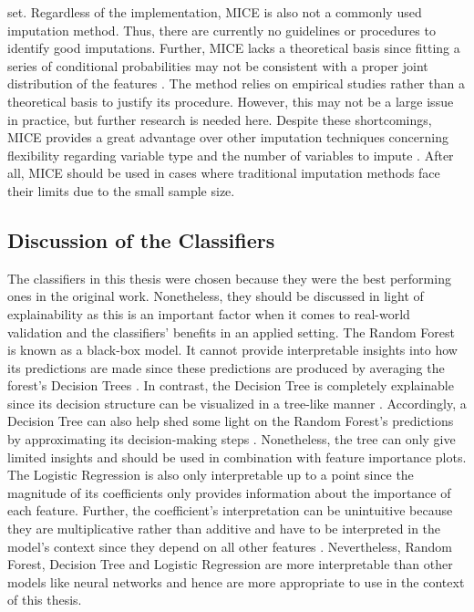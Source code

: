 set.
Regardless of the implementation, MICE is also not a commonly used imputation 
method. Thus, there are currently no guidelines or procedures to identify 
good imputations. Further, MICE lacks a theoretical basis since fitting a 
series of conditional probabilities may not be consistent with a proper joint 
distribution of the features \cite{RN141}. The method relies on empirical 
studies rather than a 
theoretical basis to justify its procedure. However, this may not be a large 
issue in practice, but further research is needed here. Despite these 
shortcomings, MICE 
provides a great advantage over other imputation techniques concerning 
flexibility regarding variable type and the number of variables to impute 
\cite{RN141, RN142}. After all, MICE should be used in cases where traditional 
imputation methods face their limits due to the small sample size.
\subsection{Discussion of the Classifiers}
\label{sec:classifiers}
The classifiers in this thesis were chosen because they were the best performing 
ones in the original work. Nonetheless, they should be discussed in light of 
explainability as this is an important factor when it comes to real-world 
validation and the classifiers' benefits in an applied setting.
The Random Forest is known as a black-box model. It cannot provide 
interpretable insights into how its predictions are made since these 
predictions are produced by averaging the forest’s Decision Trees \cite{RN163}. 
In contrast, the Decision Tree is completely explainable since its decision 
structure can be visualized in a tree-like manner \cite{RN171}. Accordingly, a 
Decision Tree can also help shed some light on the Random Forest’s predictions 
by approximating its decision-making steps \cite{RN210}. Nonetheless, the tree 
can only give limited insights and should be used in combination with feature 
importance plots. The Logistic Regression is also only interpretable up to a 
point since the magnitude of its coefficients only provides information about 
the importance of each feature. Further, the coefficient's interpretation can be 
unintuitive because they are multiplicative rather than additive and have to be 
interpreted in the model's context since they depend on all other 
features \cite{RN174}. Nevertheless, Random Forest, Decision Tree and Logistic 
Regression are more interpretable than other models like neural networks and 
hence are more appropriate to use in the context of this thesis.
